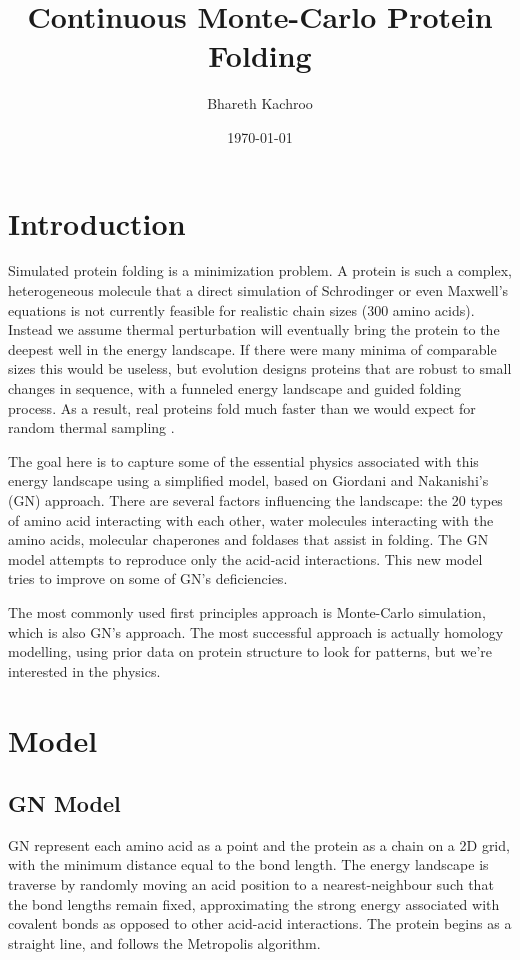 \documentclass{article}
\begin{document}
\title{Continuous Monte-Carlo Protein Folding}
\author{Bhareth Kachroo}
\date{\today}
\maketitle

\section{Introduction}
	Simulated protein folding is a minimization problem. A protein is such a complex, heterogeneous molecule that a direct simulation of Schrodinger or even Maxwell's equations is not currently feasible for realistic chain sizes (300 amino acids). Instead we assume thermal perturbation will eventually bring the protein to the deepest well in the energy landscape. If there were many minima of comparable sizes this would be useless, but evolution designs proteins that are robust to small changes in sequence, with a funneled energy landscape and guided folding process. As a result, real proteins fold much faster than we would expect for random thermal sampling \cite{fold}.

	The goal here is to capture some of the essential physics associated with this energy landscape using a simplified model, based on Giordani and Nakanishi's (GN) approach. \cite{GN} There are several factors influencing the landscape: the 20 types of amino acid interacting with each other, water molecules interacting with the amino acids, molecular chaperones and foldases that assist in folding. The GN model attempts to reproduce only the acid-acid interactions. This new model tries to improve on some of GN's deficiencies.

	The most commonly used first principles approach is Monte-Carlo simulation, which is also GN's approach. The most successful approach is actually homology modelling, using prior data on protein structure to look for patterns, but we're interested in the physics.

\section{Model}
	\subsection{GN Model}
		GN represent each amino acid as a point and the protein as a chain on a 2D grid, with the minimum distance equal to the bond length. The energy landscape is traverse by randomly moving an acid position to a nearest-neighbour such that the bond lengths remain fixed, approximating the strong energy associated with covalent bonds as opposed to other acid-acid interactions. The protein begins as a straight line, and follows the Metropolis algorithm. 
\end{document}
